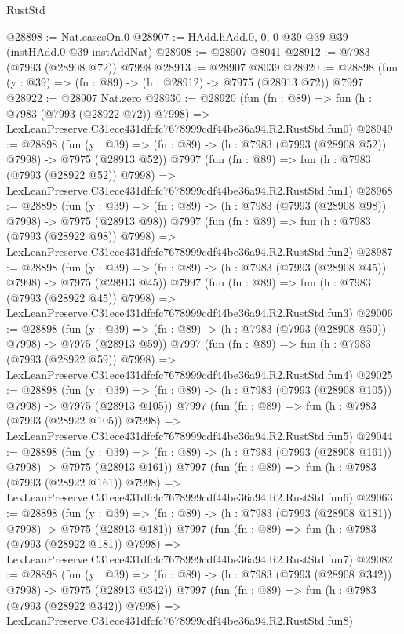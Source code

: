 \begin{lexlean}{RustStd}
\begin{coremodule}
@28898 := Nat.casesOn.{0}
@28907 := HAdd.hAdd.{0, 0, 0} @39 @39 @39 (instHAdd.{0} @39 instAddNat)
@28908 := @28907 @8041
@28912 := @7983 (@7993 (@28908 @72)) @7998
@28913 := @28907 @8039
@28920 := @28898 (fun (y : @39) => (fn : @89) -> (h : @28912) -> @7975 (@28913 @72)) @7997
@28922 := @28907 Nat.zero
@28930 := @28920
    (fun (fn : @89) =>
    fun (h : @7983 (@7993 (@28922 @72)) @7998) =>
    LexLeanPreserve.C31ece431dfcfc7678999cdf44be36a94.R2.RustStd.fun0)
@28949 := @28898
    (fun (y : @39) => (fn : @89) -> (h : @7983 (@7993 (@28908 @52)) @7998) -> @7975 (@28913 @52))
    @7997
    (fun (fn : @89) =>
    fun (h : @7983 (@7993 (@28922 @52)) @7998) =>
    LexLeanPreserve.C31ece431dfcfc7678999cdf44be36a94.R2.RustStd.fun1)
@28968 := @28898
    (fun (y : @39) => (fn : @89) -> (h : @7983 (@7993 (@28908 @98)) @7998) -> @7975 (@28913 @98))
    @7997
    (fun (fn : @89) =>
    fun (h : @7983 (@7993 (@28922 @98)) @7998) =>
    LexLeanPreserve.C31ece431dfcfc7678999cdf44be36a94.R2.RustStd.fun2)
@28987 := @28898
    (fun (y : @39) => (fn : @89) -> (h : @7983 (@7993 (@28908 @45)) @7998) -> @7975 (@28913 @45))
    @7997
    (fun (fn : @89) =>
    fun (h : @7983 (@7993 (@28922 @45)) @7998) =>
    LexLeanPreserve.C31ece431dfcfc7678999cdf44be36a94.R2.RustStd.fun3)
@29006 := @28898
    (fun (y : @39) => (fn : @89) -> (h : @7983 (@7993 (@28908 @59)) @7998) -> @7975 (@28913 @59))
    @7997
    (fun (fn : @89) =>
    fun (h : @7983 (@7993 (@28922 @59)) @7998) =>
    LexLeanPreserve.C31ece431dfcfc7678999cdf44be36a94.R2.RustStd.fun4)
@29025 := @28898
    (fun (y : @39) => (fn : @89) -> (h : @7983 (@7993 (@28908 @105)) @7998) -> @7975 (@28913 @105))
    @7997
    (fun (fn : @89) =>
    fun (h : @7983 (@7993 (@28922 @105)) @7998) =>
    LexLeanPreserve.C31ece431dfcfc7678999cdf44be36a94.R2.RustStd.fun5)
@29044 := @28898
    (fun (y : @39) => (fn : @89) -> (h : @7983 (@7993 (@28908 @161)) @7998) -> @7975 (@28913 @161))
    @7997
    (fun (fn : @89) =>
    fun (h : @7983 (@7993 (@28922 @161)) @7998) =>
    LexLeanPreserve.C31ece431dfcfc7678999cdf44be36a94.R2.RustStd.fun6)
@29063 := @28898
    (fun (y : @39) => (fn : @89) -> (h : @7983 (@7993 (@28908 @181)) @7998) -> @7975 (@28913 @181))
    @7997
    (fun (fn : @89) =>
    fun (h : @7983 (@7993 (@28922 @181)) @7998) =>
    LexLeanPreserve.C31ece431dfcfc7678999cdf44be36a94.R2.RustStd.fun7)
@29082 := @28898
    (fun (y : @39) => (fn : @89) -> (h : @7983 (@7993 (@28908 @342)) @7998) -> @7975 (@28913 @342))
    @7997
    (fun (fn : @89) =>
    fun (h : @7983 (@7993 (@28922 @342)) @7998) =>
    LexLeanPreserve.C31ece431dfcfc7678999cdf44be36a94.R2.RustStd.fun8)

\end{coremodule}
\end{lexlean}
